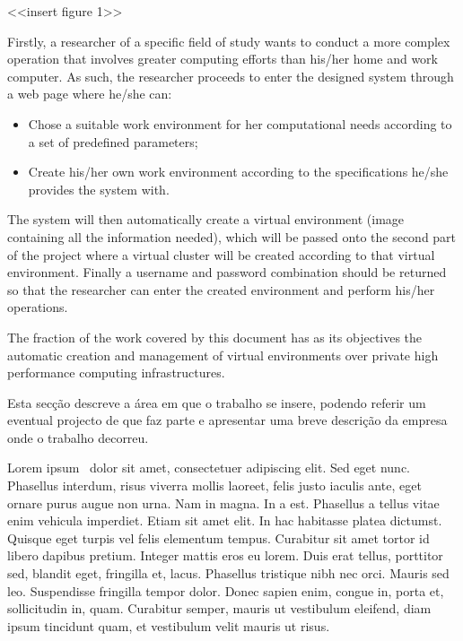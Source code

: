 <<insert figure 1>>

Firstly, a researcher of a specific field of study wants to conduct a more complex operation that involves greater computing efforts than his/her home and work computer. As such, the researcher proceeds to enter the designed system through a web page where he/she can:

\begin{itemize}
	\item Chose a suitable work environment for her computational needs according to a set of predefined parameters;
	\item Create his/her own work environment according to the specifications he/she provides the system with.
\end{itemize}

The system will then automatically create a virtual environment (image containing all the information needed), which will be passed onto the second part of the project where a virtual cluster will be created according to that virtual environment.
Finally a username and password combination should be returned so that the researcher can enter the created environment and perform his/her operations.
	
The fraction of the work covered by this document has as its objectives the automatic creation and management of virtual environments over private high performance computing infrastructures. 





Esta secção descreve a área em que o trabalho se insere, podendo
referir um eventual projecto de que faz parte e apresentar uma breve
descrição da empresa onde o trabalho decorreu.

Lorem ipsum~\citep{kn:Lip08} dolor sit amet, consectetuer adipiscing
elit. 
Sed eget nunc. Phasellus interdum, risus viverra mollis laoreet, felis
justo iaculis ante, eget ornare purus augue non urna. Nam in magna. In a
est. Phasellus a tellus vitae enim vehicula imperdiet. Etiam sit amet
elit. In hac habitasse platea dictumst. Quisque eget turpis vel felis
elementum tempus. Curabitur sit amet tortor id libero dapibus
pretium. Integer mattis eros eu lorem. Duis erat tellus, porttitor
sed, blandit eget, fringilla et, lacus. Phasellus tristique nibh nec
orci. Mauris sed leo. Suspendisse fringilla tempor dolor. Donec sapien
enim, congue in, porta et, sollicitudin in, quam. Curabitur semper,
mauris ut vestibulum eleifend, diam ipsum tincidunt quam, et
vestibulum velit mauris ut risus. 

